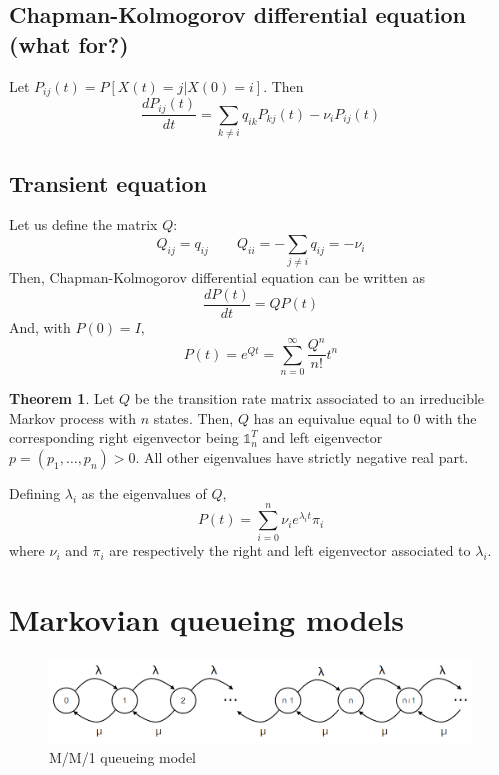 \documentclass[12pt, openany]{report}
\theoremstyle{definition}
\newtheorem{thm}{Theorem}[chapter]
\begin{document}
\subsection{Chapman-Kolmogorov differential equation (what for?)} 
Let $P_{ij}(t)=P[X(t)=j|X(0)=i]$. Then 
\begin{equation}
	\frac{dP_{ij}(t)}{dt} = \sum_{k\neq i}q_{ik}P_{kj}(t)-\nu_i P_{ij}(t)
\end{equation}
\subsection{Transient equation}
Let us define the matrix $Q$:
\begin{equation}
	Q_{ij} = q_{ij}\qquad Q_{ii} = -\sum_{j\neq i}q_{ij} = -\nu_i
\end{equation}
Then, Chapman-Kolmogorov differential equation can be written as
\begin{equation}
	\frac{dP(t)}{dt} = QP(t)
\end{equation}
And, with $P(0)=I$, 
\begin{equation}
	P(t) = e^{Qt} = \sum_{n=0}^\infty \frac{Q^n}{n!}t^n
\end{equation}
\begin{thm}
	Let $Q$ be the transition rate matrix associated to an irreducible Markov process with $n$ states. Then, $Q$ has an equivalue equal to 0 with the corresponding right eigenvector being $\mathbb{1}_n^T$ and left eigenvector $p=(p_1,\dots,p_n)>0$. All other eigenvalues have strictly negative real part. 
\end{thm}
Defining $\lambda_i$ as the eigenvalues of $Q$, 
\begin{equation}
	P(t) = \sum_{i=0}^n \nu_i e^{\lambda_i t}\pi_i 
\end{equation}
where $\nu_i$ and $\pi_i$ are respectively the right and left eigenvector associated to $\lambda_i$.
\section{Markovian queueing models}
\begin{figure}[H]
	\centering 
	\includegraphics[width=.8\textwidth]{img/queueing_model.png}
	\caption{M/M/1 queueing model}
	\label{fig:queueing_model}
\end{figure}
\end{document}
